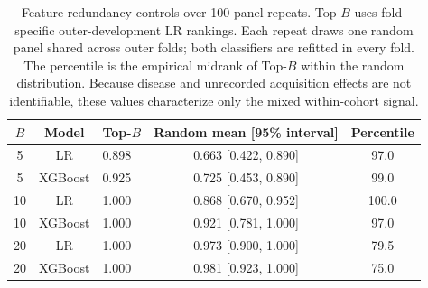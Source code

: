 \begin{table}[H]
\centering
\scriptsize
\setlength{\tabcolsep}{3pt}
\begin{tabular}{cclcc}
\toprule
$B$ & Model & Top-$B$ & Random mean [95\% interval] & Percentile \\
\midrule
5 & LR & 0.898 & 0.663 [0.422, 0.890] & 97.0 \\
5 & XGBoost & 0.925 & 0.725 [0.453, 0.890] & 99.0 \\
10 & LR & 1.000 & 0.868 [0.670, 0.952] & 100.0 \\
10 & XGBoost & 1.000 & 0.921 [0.781, 1.000] & 97.0 \\
20 & LR & 1.000 & 0.973 [0.900, 1.000] & 79.5 \\
20 & XGBoost & 1.000 & 0.981 [0.923, 1.000] & 75.0 \\
\bottomrule
\end{tabular}
\caption{Feature-redundancy controls over 100 panel repeats. Top-$B$ uses fold-specific outer-development LR rankings. Each repeat draws one random panel shared across outer folds; both classifiers are refitted in every fold. The percentile is the empirical midrank of Top-$B$ within the random distribution. Because disease and unrecorded acquisition effects are not identifiable, these values characterize only the mixed within-cohort signal.}
\label{tab:psas_random}
\end{table}
